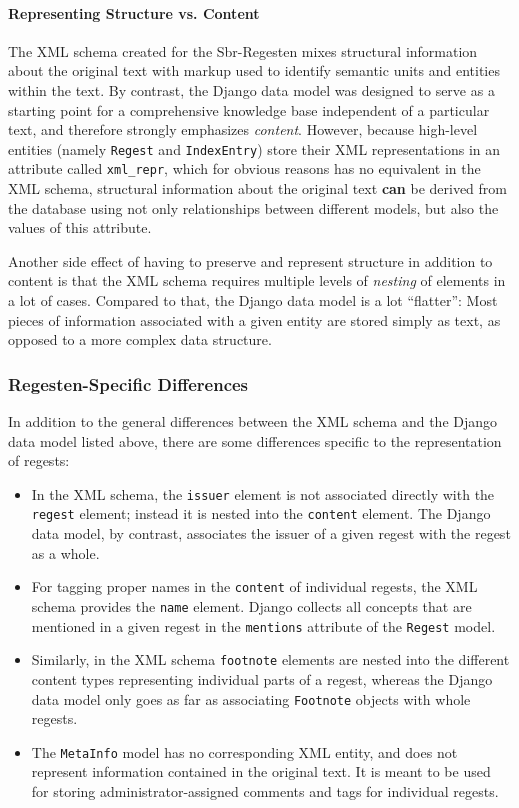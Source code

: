 \paragraph{Representing Structure vs. Content}

The XML schema created for the Sbr-Regesten mixes structural
information about the original text with markup used to identify
semantic units and entities within the text. By contrast, the Django
data model was designed to serve as a starting point for a
comprehensive knowledge base independent of a particular text, and
therefore strongly emphasizes \emph{content}. However, because
high-level entities (namely \texttt{Regest} and \texttt{IndexEntry})
store their XML representations in an attribute called
\texttt{xml\_repr}, which for obvious reasons has no equivalent in the
XML schema, structural information about the original text
\textbf{can} be derived from the database using not only relationships
between different models, but also the values of this attribute.

Another side effect of having to preserve and represent structure in
addition to content is that the XML schema requires multiple levels of
\emph{nesting} of elements in a lot of cases. Compared to that, the
Django data model is a lot ``flatter'': Most pieces of information
associated with a given entity are stored simply as text, as opposed
to a more complex data structure.

\subsubsection{Regesten-Specific Differences}
\label{sec:reg-model}

In addition to the general differences between the XML schema and the
Django data model listed above, there are some differences specific to
the representation of regests:

\begin{itemize}
\item In the XML schema, the \texttt{issuer} element is not associated
  directly with the \texttt{regest} element; instead it is nested into
  the \texttt{content} element. The Django data model, by contrast,
  associates the issuer of a given regest with the regest as a whole.
\item For tagging proper names in the \texttt{content} of individual
  regests, the XML schema provides the \texttt{name} element. Django
  collects all concepts that are mentioned in a given regest in the
  \texttt{mentions} attribute of the \texttt{Regest} model.
\item Similarly, in the XML schema \texttt{footnote} elements are
  nested into the different content types representing individual
  parts of a regest, whereas the Django data model only goes as far as
  associating \texttt{Footnote} objects with whole regests.
\item The \texttt{MetaInfo} model has no corresponding XML entity, and
  does not represent information contained in the original text. It is
  meant to be used for storing administrator-assigned comments and
  tags for individual regests.
\end{itemize}

